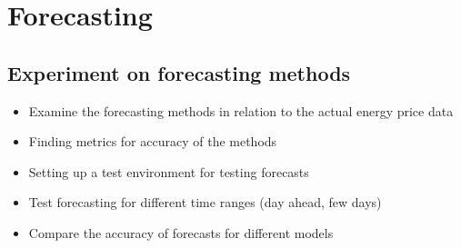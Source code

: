 \documentclass[a4paper]{article}
\begin{document}
\vspace{1em}

\hfill\date{Week 16, from 14.04. to 20.04.}

\section{Forecasting}

\subsection{Experiment on forecasting methods}

\begin{itemize}

\item Examine the forecasting methods in relation to the actual energy price data

\item Finding metrics for accuracy of the methods

\item Setting up a test environment for testing forecasts

\item Test forecasting for different time ranges (day ahead, few days)

\item Compare the accuracy of forecasts for different models

\end{itemize}
\end{document}
